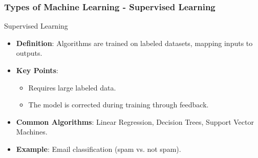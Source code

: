 \documentclass[aspectratio=169]{beamer}
\begin{document}
\begin{frame}[fragile]
    \frametitle{Types of Machine Learning - Supervised Learning}
    \begin{block}{Supervised Learning}
        \begin{itemize}
            \item \textbf{Definition}: Algorithms are trained on labeled datasets, mapping inputs to outputs.
            \item \textbf{Key Points}:
                \begin{itemize}
                    \item Requires large labeled data.
                    \item The model is corrected during training through feedback.
                \end{itemize}
            \item \textbf{Common Algorithms}: Linear Regression, Decision Trees, Support Vector Machines.
            \item \textbf{Example}: Email classification (spam vs. not spam).
        \end{itemize}
    \end{block}
\end{frame}
\end{document}
